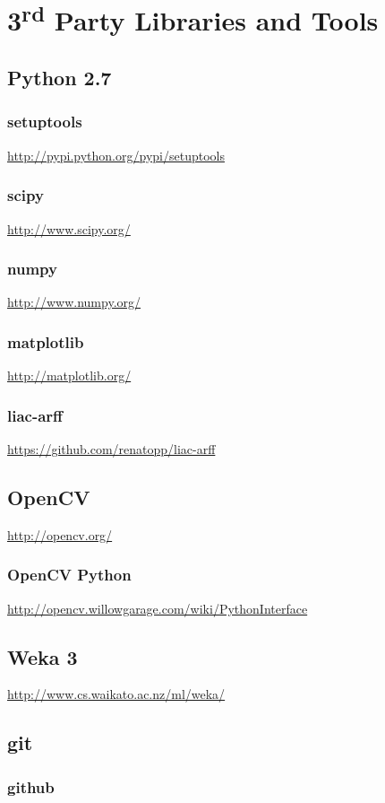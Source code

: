 \chapter{3\textsuperscript{rd} Party Libraries and Tools}


\section{Python 2.7}

\subsection{setuptools}
\url{http://pypi.python.org/pypi/setuptools}

\subsection{scipy}
\url{http://www.scipy.org/}\cite{EricJonesandTravisOliphantandPearuPetersonandothers2001SciPy}

\subsection{numpy}
\url{http://www.numpy.org/}\cite{EricJonesandTravisOliphantandPearuPetersonandothers2001SciPy}

\subsection{matplotlib}
\url{http://matplotlib.org/}

\subsection{liac-arff}
\url{https://github.com/renatopp/liac-arff}


\section{OpenCV}
\url{http://opencv.org/}\cite{opencv_library}

\subsection{OpenCV Python}
\url{http://opencv.willowgarage.com/wiki/PythonInterface}\cite{opencv_library}


\section{Weka 3}
\url{http://www.cs.waikato.ac.nz/ml/weka/}\cite{Hall2009WEKA}


\section{git}

\subsection{github}



